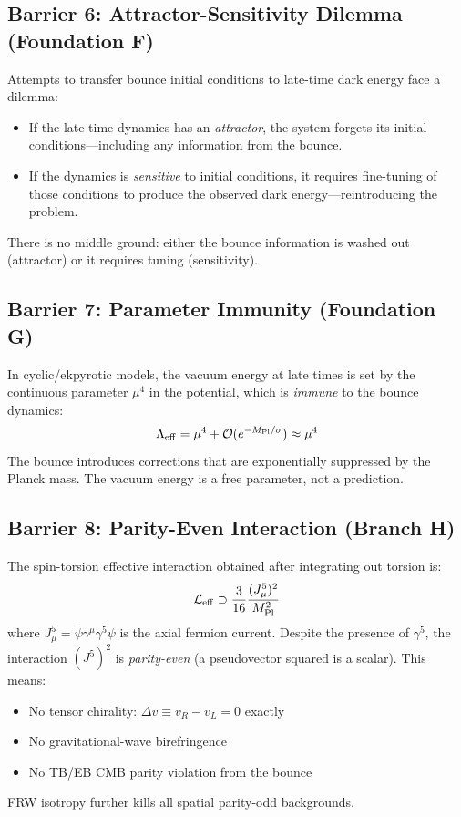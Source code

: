 \documentclass[a4paper,11pt]{article}
\newcommand{\Mpl}{M_{\rm Pl}}
\begin{document}
\subsection{Barrier 6: Attractor-Sensitivity Dilemma (Foundation F)}

Attempts to transfer bounce initial conditions to late-time dark energy face a dilemma:
\begin{itemize}
\item If the late-time dynamics has an \emph{attractor}, the system forgets its initial conditions---including any information from the bounce.
\item If the dynamics is \emph{sensitive} to initial conditions, it requires fine-tuning of those conditions to produce the observed dark energy---reintroducing the problem.
\end{itemize}
There is no middle ground: either the bounce information is washed out (attractor) or it requires tuning (sensitivity).

\subsection{Barrier 7: Parameter Immunity (Foundation G)}

In cyclic/ekpyrotic models, the vacuum energy at late times is set by the continuous parameter $\mu^4$ in the potential, which is \emph{immune} to the bounce dynamics:
\begin{equation}
\Lambda_{\rm eff} = \mu^4 + \mathcal{O}(e^{-\Mpl/\sigma}) \approx \mu^4
\end{equation}
The bounce introduces corrections that are exponentially suppressed by the Planck mass. The vacuum energy is a free parameter, not a prediction.

\subsection{Barrier 8: Parity-Even Interaction (Branch H)}

The spin-torsion effective interaction obtained after integrating out torsion is:
\begin{equation}
\mathcal{L}_{\rm eff} \supset \frac{3}{16} \frac{(J^5_\mu)^2}{\Mpl^2}
\end{equation}
where $J^5_\mu = \bar{\psi}\gamma^\mu\gamma^5\psi$ is the axial fermion current. Despite the presence of $\gamma^5$, the interaction $(J^5)^2$ is \emph{parity-even} (a pseudovector squared is a scalar). This means:
\begin{itemize}
\item No tensor chirality: $\Delta v \equiv v_R - v_L = 0$ exactly
\item No gravitational-wave birefringence
\item No TB/EB CMB parity violation from the bounce
\end{itemize}
FRW isotropy further kills all spatial parity-odd backgrounds.
\end{document}
